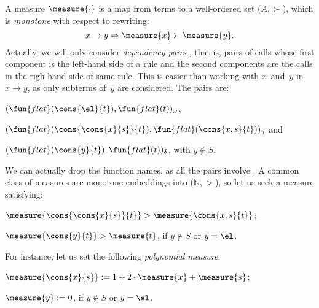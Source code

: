 A measure \(\measure{\cdot}\) is a map from terms to a
well\hyp{}ordered set (\(A,\succ\)), which is \emph{monotone} with
respect to rewriting:
\begin{equation*}
  x \rightarrow y \Rightarrow \measure{x} \succ \measure{y}.
\end{equation*}
Actually, we will only consider \emph{dependency pairs}
\citep{ArtsGiesl_2000}, that is,
pairs of calls whose first component is the left\hyp{}hand side of a
rule and the second components are the calls in the righ\hyp{}hand
side of same rule. This is easier than working with \(x\)~and~\(y\) in
\(x \rightarrow y\), as only subterms of~\(y\) are considered. The
pairs are:
\begin{itemize*}

  \item \((\fun{flat}(\cons{\el}{t}),
    \fun{flat}(t))_\omega\),

  \item \((\fun{flat}(\cons{\cons{x}{s}}{t}),
    \fun{flat}(\cons{x,s}{t}))_\gamma\) and

  \item \((\fun{flat}(\cons{y}{t}), \fun{flat}(t))_\delta\), with \(y
    \not\in S\).
\end{itemize*}
We can actually drop the function names, as all the pairs involve
. A common class of measures are
monotone embeddings into (\(\mathbb{N},>\)), so let us seek a measure
satisfying:
\begin{itemize*}

  \item \(\measure{\cons{\cons{x}{s}}{t}} > \measure{\cons{x,s}{t}}\);

  \item \(\measure{\cons{y}{t}} > \measure{t}\), if \(y \not\in S\) or
    \(y=\el\).

\end{itemize*}
For instance, let us set the following \emph{polynomial
  measure}:
\begin{itemize*}

  \item \(\measure{\cons{x}{s}} := 1 + 2\cdot\measure{x} +
    \measure{s}\);

  \item \(\measure{y} := 0\), if \(y \not\in S\) or \(y=\el\).

\end{itemize*}
